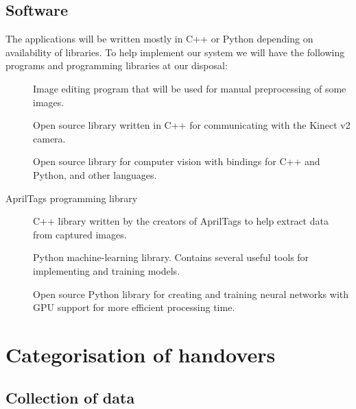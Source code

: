 \subsection*{Software}

The applications will be written mostly in C++ or Python depending on availability of libraries. To help implement our system we will have the following programs and programming libraries at our disposal:
\begin{description}
	\item[\textcite{GIMP}] Image editing program that will be used for manual preprocessing of some images.
	\item[\textcite{libfreenect2}] Open source library written in C++ for communicating with the Kinect v2 camera.
	\item[\textcite{OpenCV}] Open source library for computer vision with bindings for C++ and Python, and other languages.
	\item[AprilTags programming library] C++ library written by the creators of AprilTags to help extract data from captured images.
	\item[\textcite{scikitlearn}] Python machine-learning library. Contains several useful tools for implementing and training models.
	\item[\textcite{Tensorflow}] Open source Python library for creating and training neural networks with GPU support for more efficient processing time.
\end{description}


\section{Categorisation of handovers}

\subsection{Collection of data}

